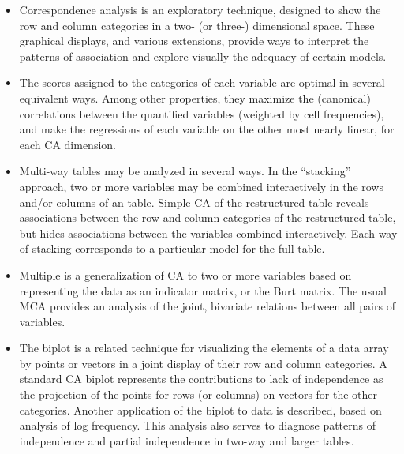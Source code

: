 \begin{itemize}
\item Correspondence analysis is an exploratory technique, designed to
show the row and column categories in a two- (or three-) dimensional
space.  These graphical displays, and various extensions, provide
ways to interpret the patterns of association and explore visually
the adequacy of certain \loglin models.

\item The scores assigned to the categories of each variable are optimal
in several equivalent ways.
Among other properties,
they maximize the (canonical) correlations between the quantified
variables (weighted by cell frequencies), and make the regressions
of each variable on the other most nearly linear, for each CA dimension.

\item Multi-way tables may be analyzed in several ways.
In the ``stacking'' approach, two or more variables may be combined
interactively in the rows and/or columns of an \nway table.
Simple CA of the restructured table reveals associations between
the row and column categories of the restructured table,
but hides associations between the variables combined interactively.
Each way of stacking corresponds to a particular \loglin model
for the full table.

\item Multiple \ca is a generalization of CA to two or more variables
based on representing the data as an indicator matrix, or the Burt matrix.
The usual MCA provides an analysis of the joint, bivariate relations
between all pairs of variables.


\item The biplot is a related technique for visualizing the elements of
a data array by points or vectors in a joint display of their row and
column categories. A standard CA biplot represents the contributions to
lack of independence as the projection of the points for rows
(or columns) on vectors for the other categories.
Another application of the biplot to \ctab data is described, based on analysis
of log frequency.
This analysis also serves to diagnose patterns of independence and
partial independence in two-way and larger tables.
\end{itemize}
